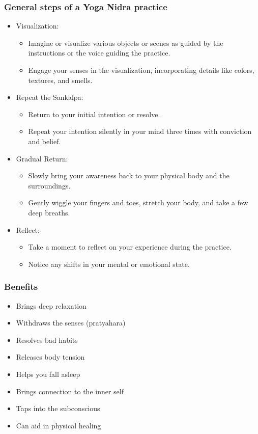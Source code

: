 \begin{frame}[fragile]\frametitle{General steps of a Yoga Nidra practice}
	\begin{itemize}

		
	\item Visualization:
	\begin{itemize}
		\item Imagine or visualize various objects or scenes as guided by the instructions or the voice guiding the practice.
		\item Engage your senses in the visualization, incorporating details like colors, textures, and smells.
	\end{itemize}
		
	\item Repeat the Sankalpa:
	\begin{itemize}
		\item Return to your initial intention or resolve.
		\item Repeat your intention silently in your mind three times with conviction and belief.
	\end{itemize}
		
	\item Gradual Return:
	\begin{itemize}
		\item Slowly bring your awareness back to your physical body and the surroundings.
		\item Gently wiggle your fingers and toes, stretch your body, and take a few deep breaths.
	\end{itemize}
		
	\item Reflect:
	\begin{itemize}
		\item Take a moment to reflect on your experience during the practice.
		\item Notice any shifts in your mental or emotional state.
	\end{itemize}
		
	\end{itemize}

\end{frame}

\begin{frame}[fragile]\frametitle{Benefits}
	\begin{itemize}
	\item Brings deep relaxation
	\item Withdraws the senses (pratyahara)
	\item Resolves bad habits
	\item Releases body tension
	\item Helps you fall asleep
	\item Brings connection to the inner self
	\item Taps into the subconscious
	\item Can aid in physical healing
	\end{itemize}

\end{frame}

